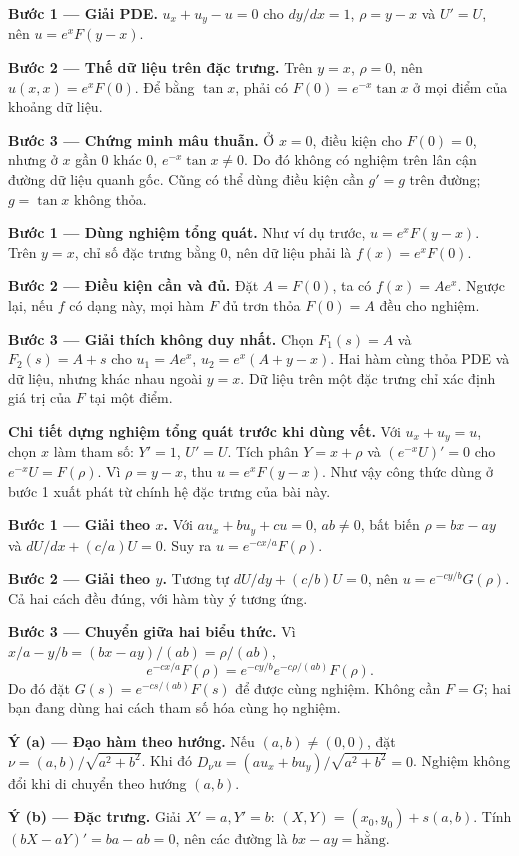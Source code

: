 \textbf{Bước 1 — Giải PDE.} $u_x+u_y-u=0$ cho $dy/dx=1$, $\rho=y-x$ và $U'=U$, nên $u=e^xF(y-x)$.

\textbf{Bước 2 — Thế dữ liệu trên đặc trưng.} Trên $y=x$, $\rho=0$, nên $u(x,x)=e^xF(0)$. Để bằng $\tan x$, phải có $F(0)=e^{-x}\tan x$ ở mọi điểm của khoảng dữ liệu.

\textbf{Bước 3 — Chứng minh mâu thuẫn.} Ở $x=0$, điều kiện cho $F(0)=0$, nhưng ở $x$ gần 0 khác 0, $e^{-x}\tan x\ne0$. Do đó không có nghiệm trên lân cận đường dữ liệu quanh gốc. Cũng có thể dùng điều kiện cần $g'=g$ trên đường; $g=\tan x$ không thỏa.

\textbf{Bước 1 — Dùng nghiệm tổng quát.} Như ví dụ trước, $u=e^xF(y-x)$. Trên $y=x$, chỉ số đặc trưng bằng 0, nên dữ liệu phải là $f(x)=e^xF(0)$.

\textbf{Bước 2 — Điều kiện cần và đủ.} Đặt $A=F(0)$, ta có $f(x)=Ae^x$. Ngược lại, nếu $f$ có dạng này, mọi hàm $F$ đủ trơn thỏa $F(0)=A$ đều cho nghiệm.

\textbf{Bước 3 — Giải thích không duy nhất.} Chọn $F_1(s)=A$ và $F_2(s)=A+s$ cho $u_1=Ae^x$, $u_2=e^x(A+y-x)$. Hai hàm cùng thỏa PDE và dữ liệu, nhưng khác nhau ngoài $y=x$. Dữ liệu trên một đặc trưng chỉ xác định giá trị của $F$ tại một điểm.

\textbf{Chi tiết dựng nghiệm tổng quát trước khi dùng vết.} Với $u_x+u_y=u$, chọn $x$ làm tham số: $Y'=1$, $U'=U$. Tích phân $Y=x+\rho$ và $(e^{-x}U)'=0$ cho $e^{-x}U=F(\rho)$. Vì $\rho=y-x$, thu $u=e^xF(y-x)$. Như vậy công thức dùng ở bước 1 xuất phát từ chính hệ đặc trưng của bài này.

\textbf{Bước 1 — Giải theo $x$.} Với $au_x+bu_y+cu=0$, $ab\ne0$, bất biến $\rho=bx-ay$ và $dU/dx+(c/a)U=0$. Suy ra $u=e^{-cx/a}F(\rho)$.

\textbf{Bước 2 — Giải theo $y$.} Tương tự $dU/dy+(c/b)U=0$, nên $u=e^{-cy/b}G(\rho)$. Cả hai cách đều đúng, với hàm tùy ý tương ứng.

\textbf{Bước 3 — Chuyển giữa hai biểu thức.} Vì $x/a-y/b=(bx-ay)/(ab)=\rho/(ab)$,
\[e^{-cx/a}F(\rho)=e^{-cy/b}e^{-c\rho/(ab)}F(\rho).\]
Do đó đặt $G(s)=e^{-cs/(ab)}F(s)$ để được cùng nghiệm. Không cần $F=G$; hai bạn đang dùng hai cách tham số hóa cùng họ nghiệm.

\textbf{Ý (a) — Đạo hàm theo hướng.} Nếu $(a,b)\ne(0,0)$, đặt $\nu=(a,b)/\sqrt{a^2+b^2}$. Khi đó $D_\nu u=(au_x+bu_y)/\sqrt{a^2+b^2}=0$. Nghiệm không đổi khi di chuyển theo hướng $(a,b)$.

\textbf{Ý (b) — Đặc trưng.} Giải $X'=a,Y'=b$: $(X,Y)=(x_0,y_0)+s(a,b)$. Tính $(bX-aY)'=ba-ab=0$, nên các đường là $bx-ay=\text{hằng}$.

